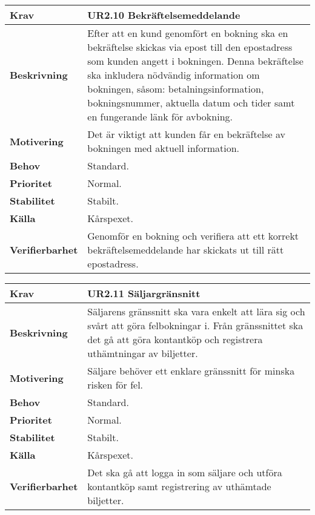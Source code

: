 \documentclass[a4paper, twoside, 11pt, titlepage]{article}
\begin{document}
		\begin{tabular} { p{2.6cm} p{12.5cm} }
			\hline
			\sffamily\textbf{Krav} & \sffamily\textbf{UR2.10 Bekräftelsemeddelande  } \\
			\hline
			\sffamily\textbf{Beskrivning} & Efter att en kund genomfört en bokning ska en bekräftelse skickas via epost till den epostadress som kunden angett i bokningen. Denna bekräftelse ska inkludera nödvändig information om bokningen, såsom: betalningsinformation, bokningsnummer, aktuella datum och tider samt en fungerande länk för avbokning.  \\
			\hline
			\sffamily\textbf{Motivering} & Det är viktigt att kunden får en bekräftelse av bokningen med aktuell information.  \\
			\hline
			\sffamily\textbf{Behov} & Standard.  \\
			\hline
			\sffamily\textbf{Prioritet} & Normal.  \\
			\hline
			\sffamily\textbf{Stabilitet} & Stabilt.  \\
			\hline
			\sffamily\textbf{Källa} & Kårspexet.  \\
			\hline
			\sffamily\textbf{Verifierbarhet} & Genomför en bokning och verifiera att ett korrekt bekräftelsemeddelande har skickats ut till rätt epostadress.  \\
			\hline
		\end{tabular}
		\vspace{6mm}

		\begin{tabular} { p{2.6cm} p{12.5cm} }
			\hline
			\sffamily\textbf{Krav} & \sffamily\textbf{UR2.11 Säljargränsnitt  } \\
			\hline
			\sffamily\textbf{Beskrivning} & Säljarens gränssnitt ska vara enkelt att lära sig och svårt att göra felbokningar i. Från gränssnittet ska det gå att göra kontantköp och registrera uthämtningar av biljetter.  \\
			\hline
			\sffamily\textbf{Motivering} & Säljare behöver ett enklare gränssnitt för minska risken för fel.  \\
			\hline
			\sffamily\textbf{Behov} & Standard.  \\
			\hline
			\sffamily\textbf{Prioritet} & Normal.  \\
			\hline
			\sffamily\textbf{Stabilitet} & Stabilt.  \\
			\hline
			\sffamily\textbf{Källa} & Kårspexet.  \\
			\hline
			\sffamily\textbf{Verifierbarhet} & Det ska gå att logga in som säljare och utföra kontantköp samt registrering av uthämtade biljetter.  \\
			\hline
		\end{tabular}
		\vspace{6mm}
\end{document}

